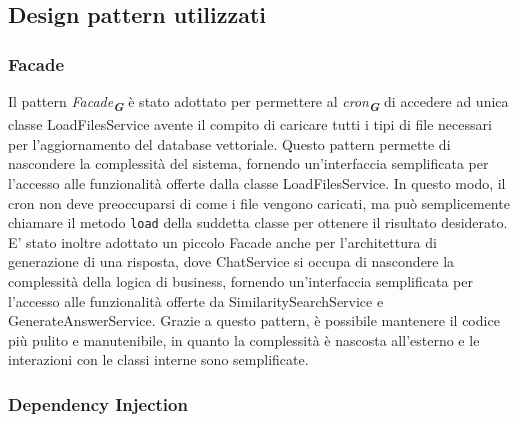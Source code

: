 \subsection{Design pattern utilizzati}
\label{sec:design_pattern_utilizzati}


\subsubsection{Facade}
\label{sec:facade}

Il pattern \emph{Facade}\textsubscript{\textbf{\textit{G}}} è stato adottato per permettere al \emph{cron}\textsubscript{\textbf{\textit{G}}} di accedere ad unica classe LoadFilesService avente il compito di caricare tutti i tipi di file necessari per l'aggiornamento del database vettoriale. Questo pattern permette di nascondere la complessità del sistema, fornendo un'interfaccia semplificata per l'accesso alle funzionalità offerte dalla classe LoadFilesService. In questo modo, il cron non deve preoccuparsi di come i file vengono caricati, ma può semplicemente chiamare il metodo \texttt{load} della suddetta classe per ottenere il risultato desiderato.
E' stato inoltre adottato un piccolo Facade anche per l'architettura di generazione di una risposta, dove ChatService si occupa di nascondere la complessità della logica di business, fornendo un'interfaccia semplificata per l'accesso alle funzionalità offerte da SimilaritySearchService e GenerateAnswerService.
Grazie a questo pattern, è possibile mantenere il codice più pulito e manutenibile, in quanto la complessità è nascosta all'esterno e le interazioni con le classi interne sono semplificate.


\subsubsection{Dependency Injection}
\label{sec:dependency_injection}

